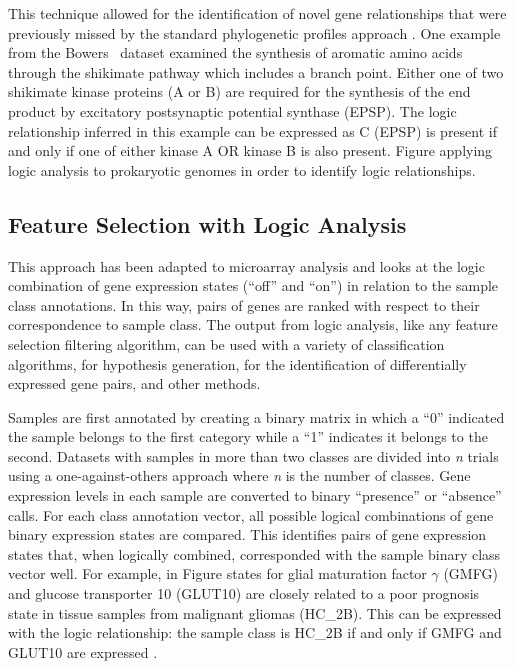 This technique allowed for the identification of novel gene relationships that
were previously missed by the standard phylogenetic profiles approach
\cite{PMID_144923264}.  One example from the Bowers \ea\ dataset examined the
synthesis of aromatic amino acids through the shikimate pathway which includes
a branch point.  Either one of two shikimate kinase proteins (A or B) are
required for the synthesis of the end product by excitatory postsynaptic
potential synthase (EPSP). The logic relationship inferred in this example can
be expressed as C (EPSP) is present if and only if one of either kinase A OR
kinase B is also present.  Figure %
applying logic analysis to prokaryotic genomes in order to identify logic
relationships.

\subsection{Feature Selection with Logic Analysis}

This approach has been adapted to microarray analysis and looks at the logic
combination of gene expression states (``off'' and ``on'') in relation to the sample
class annotations.  In this way, pairs of genes are ranked with respect to
their correspondence to sample class.  The output from logic analysis, like any
feature selection filtering algorithm, can be used with a variety of
classification algorithms, for hypothesis generation, for the identification of
differentially expressed gene pairs, and other methods.

Samples are first annotated by creating a binary matrix in which a ``0''
indicated the sample belongs to the first category while a ``1'' indicates it
belongs to the second.  Datasets with samples in more than two classes are
divided into \emph{n} trials using a one-against-others approach where \emph{n}
is the number of classes.  Gene expression levels in each sample are converted
to binary ``presence'' or ``absence'' calls.  For each class annotation vector,
all possible logical combinations of gene binary expression states are
compared.  This identifies pairs of gene expression states that, when logically
combined, corresponded with the sample binary class vector well. For example,
in Figure %
states for glial maturation factor $\gamma$ (GMFG) and glucose transporter 10
(GLUT10) are closely related to a poor prognosis state in tissue samples from
malignant gliomas (HC\_2B). This can be expressed with the logic relationship:
the sample class is HC\_2B if and only if GMFG and GLUT10 are expressed
\cite{PMID_170746732}.

